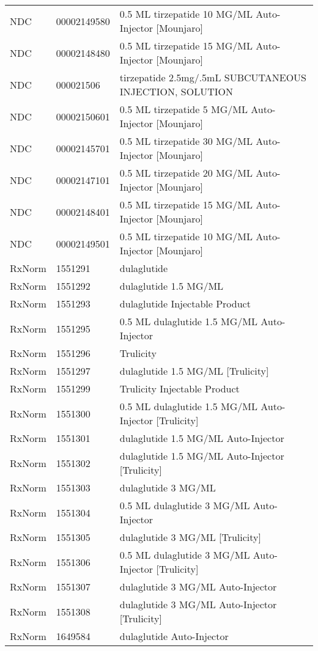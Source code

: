 \begin{longtable}{p{}p{}p{}}
  NDC & 00002149580 & 0.5 ML tirzepatide 10 MG/ML Auto-Injector [Mounjaro] \\ 
  NDC & 00002148480 & 0.5 ML tirzepatide 15 MG/ML Auto-Injector [Mounjaro] \\ 
  NDC & 000021506 & tirzepatide 2.5mg/.5mL SUBCUTANEOUS INJECTION, SOLUTION \\ 
  NDC & 00002150601 & 0.5 ML tirzepatide 5 MG/ML Auto-Injector [Mounjaro] \\ 
  NDC & 00002145701 & 0.5 ML tirzepatide 30 MG/ML Auto-Injector [Mounjaro] \\ 
  NDC & 00002147101 & 0.5 ML tirzepatide 20 MG/ML Auto-Injector [Mounjaro] \\ 
  NDC & 00002148401 & 0.5 ML tirzepatide 15 MG/ML Auto-Injector [Mounjaro] \\ 
  NDC & 00002149501 & 0.5 ML tirzepatide 10 MG/ML Auto-Injector [Mounjaro] \\ 
  RxNorm & 1551291 & dulaglutide \\ 
  RxNorm & 1551292 & dulaglutide 1.5 MG/ML \\ 
  RxNorm & 1551293 & dulaglutide Injectable Product \\ 
  RxNorm & 1551295 & 0.5 ML dulaglutide 1.5 MG/ML Auto-Injector \\ 
  RxNorm & 1551296 & Trulicity \\ 
  RxNorm & 1551297 & dulaglutide 1.5 MG/ML [Trulicity] \\ 
  RxNorm & 1551299 & Trulicity Injectable Product \\ 
  RxNorm & 1551300 & 0.5 ML dulaglutide 1.5 MG/ML Auto-Injector [Trulicity] \\ 
  RxNorm & 1551301 & dulaglutide 1.5 MG/ML Auto-Injector \\ 
  RxNorm & 1551302 & dulaglutide 1.5 MG/ML Auto-Injector [Trulicity] \\ 
  RxNorm & 1551303 & dulaglutide 3 MG/ML \\ 
  RxNorm & 1551304 & 0.5 ML dulaglutide 3 MG/ML Auto-Injector \\ 
  RxNorm & 1551305 & dulaglutide 3 MG/ML [Trulicity] \\ 
  RxNorm & 1551306 & 0.5 ML dulaglutide 3 MG/ML Auto-Injector [Trulicity] \\ 
  RxNorm & 1551307 & dulaglutide 3 MG/ML Auto-Injector \\ 
  RxNorm & 1551308 & dulaglutide 3 MG/ML Auto-Injector [Trulicity] \\ 
  RxNorm & 1649584 & dulaglutide Auto-Injector \\ 

\end{longtable}
